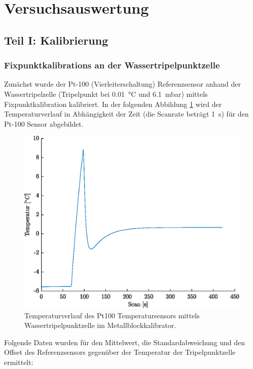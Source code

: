 \section{Versuchsauswertung}

\subsection{Teil I: Kalibrierung}

\subsubsection{Fixpunktkalibrations an der Wassertripelpunktzelle}

Zunächst wurde der Pt-100 (Vierleiterschaltung) Referenzsensor anhand der Wassertripelzelle (Tripelpunkt bei \SI{0,01}{\celsius} und \SI{6,1}{\milli\bar}) mittels Fixpunktkalibration kalibriert. In der folgenden Abbildung \ref{fig:Fixpunkt} wird der Temperaturverlauf in Abhängigkeit der Zeit (die Scanrate beträgt \SI{1}{\second}) für den Pt-100 Sensor abgebildet. 

\begin{figure}[H]
	\centering
	\includegraphics[height=0.3\textheight]{../MLAB/Fixpunktkalibration.eps}
	\caption[Temperaturverlauf des Pt100 Temperatursensors mittels Wassertripelpunktzelle]{ Temperaturverlauf des Pt100 Temperatursensors mittels Wassertripelpunktzelle im Metallblockkalibrator.}
	\label{fig:Fixpunkt}
\end{figure}

Folgende Daten wurden für den Mittelwert, die Standardabweichung und den Offset des Referenzsensors gegenüber der Temperatur der Tripelpunktzelle ermittelt: 


